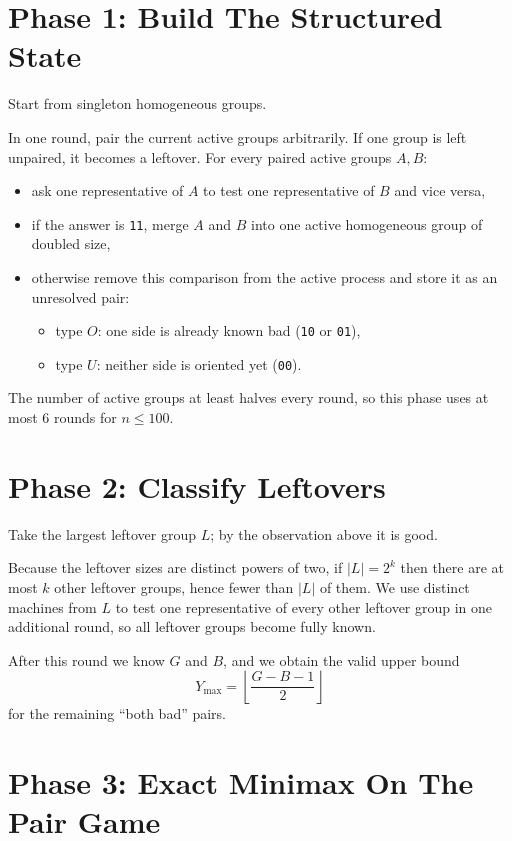 \documentclass[11pt]{article}
\begin{document}
\section*{Phase 1: Build The Structured State}

Start from singleton homogeneous groups.

In one round, pair the current active groups arbitrarily. If one group is left unpaired, it becomes a leftover. For every paired active groups $A,B$:

\begin{itemize}[leftmargin=*]
    \item ask one representative of $A$ to test one representative of $B$ and vice versa,
    \item if the answer is \texttt{11}, merge $A$ and $B$ into one active homogeneous group of doubled size,
    \item otherwise remove this comparison from the active process and store it as an unresolved pair:
    \begin{itemize}[leftmargin=*]
        \item type $O$: one side is already known bad (\texttt{10} or \texttt{01}),
        \item type $U$: neither side is oriented yet (\texttt{00}).
    \end{itemize}
\end{itemize}

The number of active groups at least halves every round, so this phase uses at most $6$ rounds for $n \le 100$.

\section*{Phase 2: Classify Leftovers}

Take the largest leftover group $L$; by the observation above it is good.

Because the leftover sizes are distinct powers of two, if $|L| = 2^k$ then there are at most $k$ other leftover groups, hence fewer than $|L|$ of them. We use distinct machines from $L$ to test one representative of every other leftover group in one additional round, so all leftover groups become fully known.

After this round we know $G$ and $B$, and we obtain the valid upper bound
\[
    Y_{\max} = \left\lfloor \frac{G-B-1}{2} \right\rfloor
\]
for the remaining ``both bad'' pairs.

\section*{Phase 3: Exact Minimax On The Pair Game}
\end{document}
